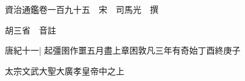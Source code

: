 






























































資治通鑑卷一百九十五　宋　司馬光　撰

胡三省　音註

唐紀十一|{
	起彊圉作噩五月盡上章困敦凡三年有奇始丁酉終庚子}


太宗文武大聖大廣孝皇帝中之上

